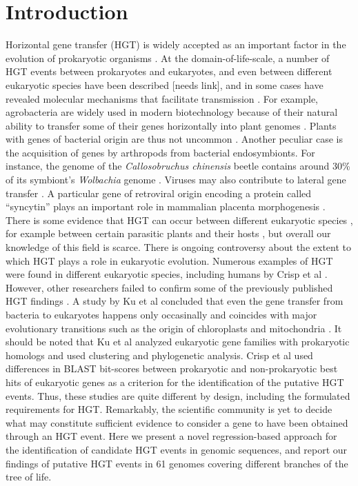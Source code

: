 \section{Introduction}
\label{intro}
Horizontal gene transfer (HGT) is widely accepted as an important factor in the
evolution of prokaryotic organisms \cite{Ochman2000}. At the
domain-of-life-scale, a number of HGT events between prokaryotes and
eukaryotes, and even between different eukaryotic species have been described
[needs link], and in some cases have revealed molecular mechanisms that
facilitate transmission \cite{Soucy2015}. For example, agrobacteria are widely
used in modern biotechnology because of their natural ability to transfer some
of their genes horizontally into plant genomes \cite{Chilton1977}. Plants with
genes of bacterial origin are thus not uncommon \cite{Kyndt2015, Matveeva2012,
Matveeva2014}. Another peculiar case is the acquisition of genes by arthropods
from bacterial endosymbionts. For instance, the genome of the
\textit{Callosobruchus chinensis} beetle contains around 30\% of its symbiont's
\textit{Wolbachia} genome \cite{Nikoh2008}. Viruses may also contribute to
lateral gene transfer \cite{Drezen2017}. A particular gene of retroviral origin
encoding a protein called ``syncytin'' plays an important role in mammalian
placenta morphogenesis \cite{Mi2000}. There is some evidence that HGT can occur
between different eukaryotic species \cite{Soucy2015}, for example between
certain parasitic plants and their hosts
\cite{Yoshida2010, Xi2012, Zhang2013, Zhang2014}, but overall our knowledge of
this field is scarce. There is ongoing controversy about the extent to which
HGT plays a role in eukaryotic evolution. Numerous examples of HGT were found
in different eukaryotic species, including humans by Crisp et al
\cite{Crisp2015}. However, other researchers failed to confirm some of the
previously published HGT findings \cite{Salzberg2017}. A study by Ku et al concluded that
even the gene transfer from bacteria to eukaryotes happens only occasinally and
coincides with major evolutionary transitions such as the origin of
chloroplasts and mitochondria \cite{Ku2015}. It should be noted that Ku et al
analyzed eukaryotic gene families with prokaryotic homologs and used clustering
and phylogenetic analysis. Crisp et al used differences in BLAST bit-scores
between prokaryotic and non-prokaryotic best hits of eukaryotic genes as a
criterion for the identification of the putative HGT events. Thus, these
studies are quite different by design, including the formulated requirements
for HGT. Remarkably, the scientific community is yet to decide what may
constitute sufficient evidence to consider a gene to have been obtained through
an HGT event. Here we present a novel regression-based approach for the
identification of candidate HGT events in genomic sequences, and report our
findings of putative HGT events in 61 genomes covering different branches of
the tree of life.
